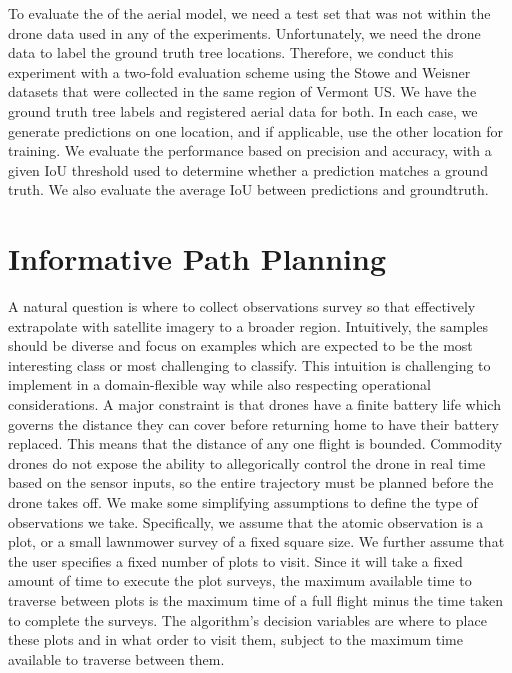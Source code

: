 To evaluate the of the aerial model, we need a test set that was not within the drone data used in any of the experiments. Unfortunately, we need the drone data to label the ground truth tree locations. Therefore, we conduct this experiment with a two-fold evaluation scheme using the Stowe and Weisner datasets that were collected in the same region of Vermont US. We have the ground truth tree labels and registered aerial data for both.
In each case, we generate predictions on one location, and if applicable, use the other location for training. We evaluate the performance based on precision and accuracy, with a given IoU threshold used to determine whether a prediction matches a ground truth. We also evaluate the average IoU between predictions and groundtruth.




\section{Informative Path Planning}
A natural question is where to collect observations survey so that effectively extrapolate with satellite imagery to a broader region. 
Intuitively, the samples should be diverse and focus on examples which are expected to be the most interesting class or most challenging to classify. This intuition is challenging to implement in a domain-flexible way while also respecting operational considerations.
A major constraint is that drones have a finite battery life which governs the distance they can cover before returning home to have their battery replaced. This means that the distance of any one flight is bounded. Commodity drones do not expose the ability to allegorically control the drone in real time based on the sensor inputs, so the entire trajectory must be planned before the drone takes off.
We make some simplifying assumptions to define the type of observations we take. Specifically, we assume that the atomic observation is a plot, or a small lawnmower survey of a fixed square size. We further assume that the user specifies a fixed number of plots to visit. Since it will take a fixed amount of time to execute the plot surveys, the maximum available time to traverse between plots is the maximum time of a full flight minus the time taken to complete the surveys. The algorithm's decision variables are where to place these plots and in what order to visit them, subject to the maximum time available to traverse between them.


